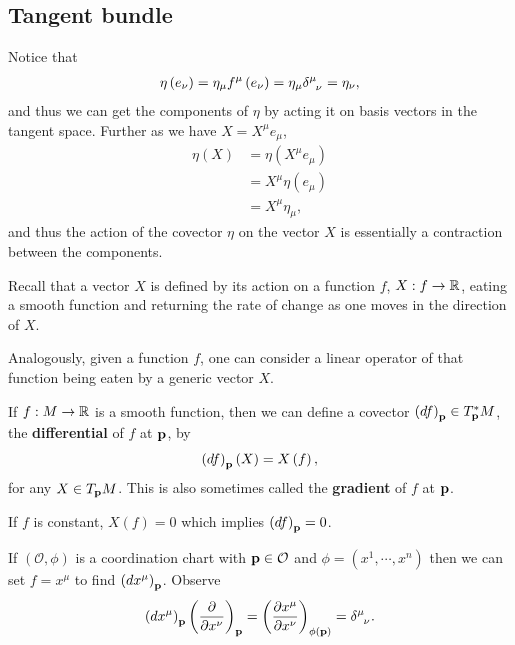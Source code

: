 

\subsection{Tangent bundle}



Notice that
\begin{align}
    \eta \left( e_\nu \right)  = \eta_\mu f^{\mu} \left( e_{\nu} \right) = \eta_\mu \tensor{\delta}{^{\mu}_\nu} = \eta_\nu
,\end{align}
and thus we can get the components of $\eta$ by acting it on basis vectors in the tangent space. Further as we have $X = X^{\mu} e_{\mu}$,
\begin{align}
    \eta \left( X \right) &= \eta \left( X^{\mu} e_{\mu} \right)\\
    &= X^{\mu} \eta \left( e_\mu \right)  \\
    &= X^{\mu} \eta_\mu 
,\end{align}
and thus the action of the covector $\eta$ on the vector $X$ is essentially a contraction between the components.

Recall that a vector $X$ is defined by its action on a function $f$, $X : f \to \mathbb{R}$, eating a smooth function and returning the rate of change as one moves in the direction of $X$.

Analogously, given a function $f$, one can consider a linear operator of that function being eaten by a generic vector $X$.

\begin{definition}
    If $f : M \to \mathbb{R}$ is a smooth function, then we can define a covector $\left( d f \right)_{\vb{p}} \in T_{\vb{p}}^{*} M$, the \textbf{differential} of $f$ at $\vb{p}$, by
    \begin{align}
        \left( d f \right)_{\vb{p}} \left( X \right) = X \left( f \right) 
    ,\end{align}
    for any $X \in T_{\vb{p}} M$.
    This is also sometimes called the \textbf{gradient} of $f$ at $\vb{p}$.
\end{definition}

If $f$ is constant, $X \left( f \right) = 0$ which implies $\left( d f \right)_{\vb{p}} = 0$.

If $\left( \mathcal{O}, \phi \right) $ is a coordination chart with $\vb{p} \in \mathcal{O}$ and $\phi = \left( x^1, \cdots, x^{n} \right) $ then we can set $f = x^{\mu}$ to find $\left( dx^{\mu} \right)_{\vb{p}}$. Observe
\begin{align}
    \left( d x^{\mu} \right)_{\vb{p}} \left( \pdv{x^{\nu}} \right)_{\vb{p}} = \left( \pdv{x^{\mu}}{x^{\nu}} \right)_{\phi \left( \vb{p} \right) } = \tensor{\delta}{^{\mu}_{\nu}} 
.\end{align}

